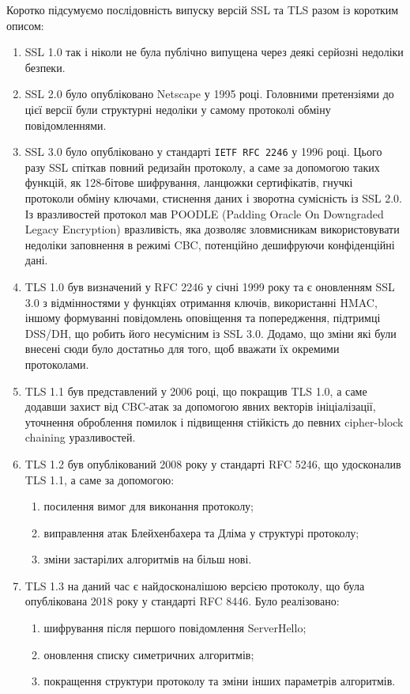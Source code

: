 Коротко підсумуємо послідовність випуску версій SSL та TLS разом із коротким описом:
\begin{enumerate}
    \item SSL 1.0 так і ніколи не була публічно випущена через деякі серйозні недоліки безпеки.
    
    \item SSL 2.0 було опубліковано Netscape у 1995 році. Головними претензіями до цієї версії були структурні недоліки у самому протоколі обміну повідомленнями.
    
    \item SSL 3.0 було опубліковано у стандарті \texttt{IETF RFC 2246} у 1996 році. Цього разу SSL спіткав повний редизайн протоколу, а саме за допомогою таких функцій, як 128-бітове шифрування, ланцюжки сертифікатів, гнучкі протоколи обміну ключами, стиснення даних і зворотна сумісність із SSL 2.0. Із вразливостей протокол мав POODLE (Padding Oracle On Downgraded Legacy Encryption) вразливість, яка дозволяє зловмисникам використовувати недоліки заповнення в режимі CBC, потенційно дешифруючи конфіденційні дані.
    
    \item TLS 1.0 був визначений у RFC 2246 у січні 1999 року та є оновленням SSL 3.0 з відмінностями у функціях отримання ключів, використанні HMAC, іншому формуванні повідомлень оповіщення та попередження, підтримці DSS/DH, що робить його несумісним із SSL 3.0. Додамо, що зміни які були внесені сюди було достатньо для того, щоб вважати їх окремими протоколами.
    
    \item TLS 1.1 був представлений у 2006 році, що покращив TLS 1.0, а саме додавши захист від CBC-атак за допомогою явних векторів ініціалізації, уточнення оброблення помилок і підвищення стійкість до певних cipher-block chaining уразливостей.
    
    \item TLS 1.2 був опублікований 2008 року у стандарті RFC 5246, що удосконалив TLS 1.1, а саме за допомогою:
    \begin{enumerate}
        \item посилення вимог для виконання протоколу;
        \item виправлення атак Блейхенбахера та Дліма у структурі протоколу;
        \item зміни застарілих алгоритмів на більш нові.
    \end{enumerate}

    \item TLS 1.3 на даний час є найдосконалішою версією протоколу, що була опублікована 2018 року у стандарті RFC 8446. Було реалізовано:
    \begin{enumerate}
        \item шифрування після першого повідомлення ServerHello;
        \item оновлення списку симетричних алгоритмів;
        \item покращення структури протоколу та зміни інших параметрів алгоритмів.
    \end{enumerate}
\end{enumerate}


